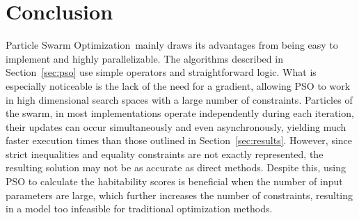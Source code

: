 \documentclass[10pt,draft]{article}
\newcommand{\pso}{Particle Swarm Optimization}
\begin{document}
\section{Conclusion}\label{sec:conc}

\pso\ mainly draws its advantages from being easy to implement and highly parallelizable. The algorithms described in
Section~\ref{sec:pso} use simple operators and straightforward logic. What is especially noticeable is the lack of the
need for a gradient, allowing PSO to work in high dimensional search spaces with a large number of constraints.
Particles of the swarm, in most implementations operate independently during each iteration, their updates can occur
simultaneously and even asynchronously, yielding much faster execution times than those outlined in
Section~\ref{sec:results}. However, since strict inequalities and equality constraints are not exactly represented, the
resulting solution may not be as accurate as direct methods. Despite this, using PSO to calculate the habitability
scores is beneficial when the number of input parameters are large, which further increases the number of constraints,
resulting in a model too infeasible for traditional optimization methods.


\printbibliography
\end{document}

